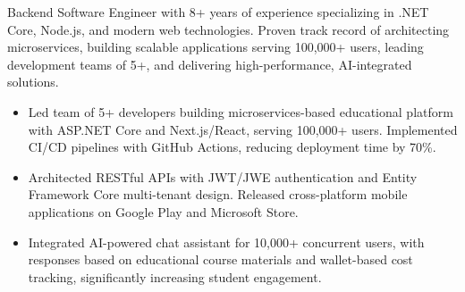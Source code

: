 \documentclass[10pt,a4paper]{altacv}
\begin{document}

\begin{fullwidth}
\makecvheader
\end{fullwidth}



Backend Software Engineer with 8+ years of experience specializing in .NET Core, Node.js, and modern web technologies. Proven track record of architecting microservices, building scalable applications serving 100,000+ users, leading development teams of 5+, and delivering high-performance, AI-integrated solutions.

\divider


\begin{itemize}
\item Led team of 5+ developers building microservices-based educational platform with ASP.NET Core and Next.js/React, serving 100,000+ users. Implemented CI/CD pipelines with GitHub Actions, reducing deployment time by 70\%.
\item Architected RESTful APIs with JWT/JWE authentication and Entity Framework Core multi-tenant design. Released cross-platform mobile applications on Google Play and Microsoft Store.
\item Integrated AI-powered chat assistant for 10,000+ concurrent users, with responses based on educational course materials and wallet-based cost tracking, significantly increasing student engagement.
\end{itemize}
\end{document}
